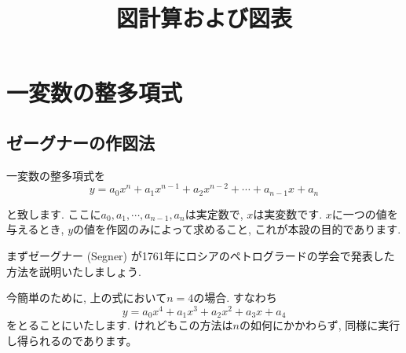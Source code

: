 \documentclass[11pt,a4paper]{jsarticle}
\title{図計算および図表}
\begin{document}
\maketitle
%
%
\section {一変数の整多項式}
\subsection {ゼーグナーの作図法}

一変数の整多項式を
\begin{equation}
y = a_0 x^n + a_1 x^{n-1} + a_2 x^{n-2} + \cdots + a_{n-1} x + a_n
\end{equation}

と致します. ここに$a_0, a_1, \cdots,a_{n-1},a_n$は実定数で, $x$は実変数です. $x$に一つの値を与えるとき, $y$の値を作図のみによって求めること, これが本設の目的であります. 

まずゼーグナー (Segner) が1761年にロシアのペトログラードの学会で発表した方法を説明いたしましょう. 

今簡単のために, 上の式において$n=4$の場合. すなわち
\begin{equation}
y = a_0x^4+a_1x^3+a_2x^2+a_3x+a_4
\end{equation}
をとることにいたします.
けれどもこの方法は$n$の如何にかかわらず, 同様に実行し得られるのであります。

%
%
\end{document}
